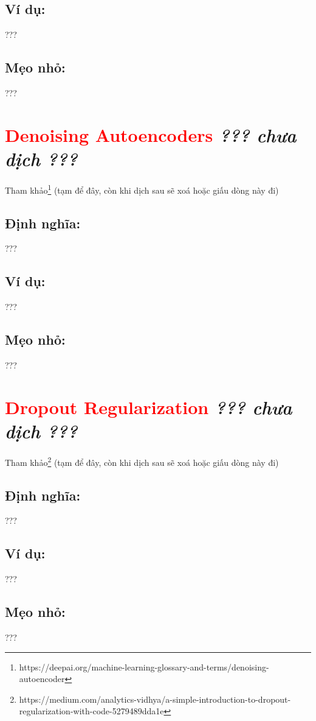 \subsection*{Ví dụ:}
???
\subsection*{Mẹo nhỏ:}
???
\section*{\huge \textcolor{Red}{Denoising Autoencoders}  \small \textit{??? chưa dịch ???} }
Tham khảo\footnote{https://deepai.org/machine-learning-glossary-and-terms/denoising-autoencoder} (tạm để đây, còn khi dịch sau sẽ xoá hoặc giấu dòng này đi)
\subsection*{Định nghĩa:}
???
\subsection*{Ví dụ:}
???
\subsection*{Mẹo nhỏ:}
???
\section*{\huge \textcolor{Red}{Dropout Regularization}  \small \textit{??? chưa dịch ???} }
Tham khảo\footnote{https://medium.com/analytics-vidhya/a-simple-introduction-to-dropout-regularization-with-code-5279489dda1e} (tạm để đây, còn khi dịch sau sẽ xoá hoặc giấu dòng này đi)
\subsection*{Định nghĩa:}
???
\subsection*{Ví dụ:}
???
\subsection*{Mẹo nhỏ:}
???
